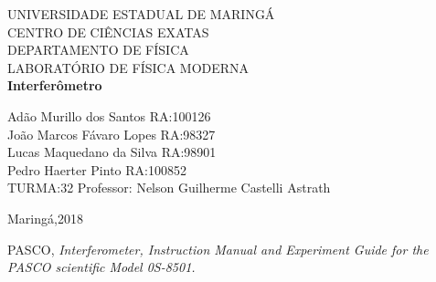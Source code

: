\documentclass[a4paper,10pt]{article}
\begin{document}
	
	\begin{titlepage}
		\begin{center}
		{\large UNIVERSIDADE ESTADUAL DE MARINGÁ}\\[0.2cm]
		{\large CENTRO DE CIÊNCIAS EXATAS}\\[0.2cm]
		{\large DEPARTAMENTO DE FÍSICA}\\[0.2cm]
		{\large LABORATÓRIO DE FÍSICA MODERNA}\\[7.0cm]
		{\bf \huge Interferômetro}\\[7.0cm]
		\end{center}
	{\large Adão Murillo dos Santos \hfill RA:100126}\\[0.7cm]
	{\large João Marcos Fávaro Lopes \hfill RA:98327}\\[0.7cm]
	{\large Lucas Maquedano da Silva \hfill RA:98901}\\[0.7cm]
	{\large Pedro Haerter Pinto \hfill RA:100852}\\[0.7cm]
	{\large TURMA:32 \hfill Professor: Nelson Guilherme Castelli
	Astrath}
	
	\vfill
		\begin{center}
		{\large Maringá,2018}
		\end{center}
	\end{titlepage}

	\tableofcontents
	
	
		
	
\vspace{3cm}
	\begin{thebibliography}{1}
    	PASCO, \it{Interferometer}, Instruction Manual and Experiment Guide for the PASCO scientific Model 0S-8501.
	\end{thebibliography}	
	
\end{document}

